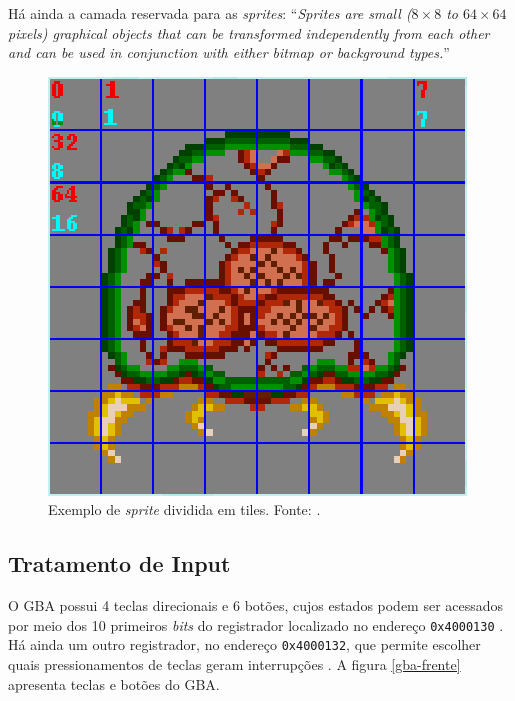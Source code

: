     Há ainda a camada reservada para as \textit{sprites}: ``\textit{Sprites are small ($8\times8$ to $64\times64$ pixels) graphical objects that can be transformed independently from each other and can be used in conjunction with either bitmap or background types.}'' \cite[p. 38]{tonc}

    \begin{figure}[H]
    \centering \includegraphics[keepaspectratio=true,scale=0.6]{figuras/metroid-sprite.eps}
      \caption[Exemplo de \textit{sprite} dividida em tiles]
        {Exemplo de \textit{sprite} dividida em tiles. Fonte: \cite{tonc}.}
      \label{metroid-sprite}
    \end{figure}

  \subsection{Tratamento de Input}

    O GBA possui 4 teclas direcionais e 6 botões, cujos estados podem ser acessados por meio dos 10 primeiros \textit{bits} do registrador localizado no endereço \texttt{0x4000130} \cite{gbatek}. Há ainda um outro registrador, no endereço \texttt{0x4000132}, que permite escolher quais pressionamentos de teclas geram interrupções \cite{cowbite}. A figura \ref{gba-frente} apresenta teclas e botões do GBA.

